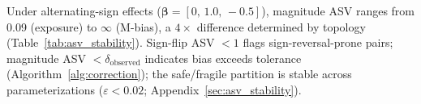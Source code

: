 Under alternating-sign effects ($\boldsymbol{\beta}{=}[0,\,1.0,\,-0.5]$), magnitude ASV ranges from 0.09 (exposure) to $\infty$ (M-bias), a $4{\times}$ difference determined by topology (Table~\ref{tab:asv_stability}). Sign-flip ASV $< 1$ flags sign-reversal-prone pairs; magnitude ASV $< \delta_{\text{observed}}$ indicates bias exceeds tolerance (Algorithm~\ref{alg:correction}); the safe/fragile partition is stable across parameterizations ($\varepsilon < 0.02$; Appendix~\ref{sec:asv_stability}).

